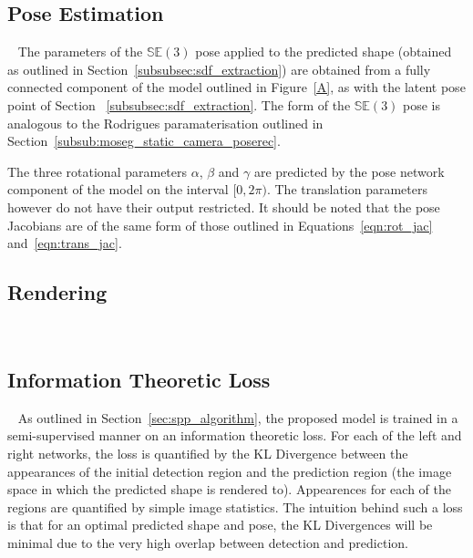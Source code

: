 \subsection{Pose Estimation}
~\label{subsec:spp_pose_estim}
The parameters of the \( \mathbb{SE}(3) \) pose applied to the predicted shape (obtained 
as outlined in Section~\ref{subsubsec:sdf_extraction}) are obtained from a fully connected 
component of the model outlined in Figure~\ref{A}, as with the latent pose point of Section
~\ref{subsubsec:sdf_extraction}. The form of the \( \mathbb{SE}(3) \) pose is analogous to 
the Rodrigues paramaterisation outlined in Section~\ref{subsub:moseg_static_camera_poserec}.

The three rotational parameters \( \alpha \), \( \beta \) and \( \gamma \) are predicted by 
the pose network component of the model on the interval \( [0, 2\pi) \). The translation parameters 
however do not have their output restricted. It should be noted that the pose Jacobians are of the 
same form of those outlined in Equations~\ref{eqn:rot_jac} and~\ref{eqn:trans_jac}.

\subsection{Rendering}
~\label{subsec:spp_rendering}

\subsection{Information Theoretic Loss}
~\label{subsec:spp_loss}
As outlined in Section~\ref{sec:spp_algorithm}, the proposed model is trained in a semi-supervised 
manner on an information theoretic loss. For each of the left and right networks, the loss is 
quantified by the KL Divergence between the appearances of the initial detection region and 
the prediction region (the image space in which the predicted shape is rendered to). Appearences for 
each of the regions are quantified by simple image statistics. The intuition behind such a loss is that 
for an optimal predicted shape and pose, the KL Divergences will be minimal due to the very high overlap 
between detection and prediction.

